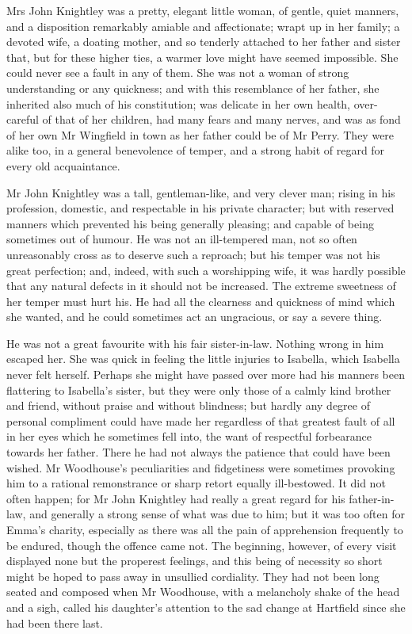 Mrs John Knightley was a pretty, elegant little woman, of gentle, quiet manners, and a disposition remarkably amiable and affectionate; wrapt up in her family; a devoted wife, a doating mother, and so tenderly attached to her father and sister that, but for these higher ties, a warmer love might have seemed impossible. She could never see a fault in any of them. She was not a woman of strong understanding or any quickness; and with this resemblance of her father, she inherited also much of his constitution; was delicate in her own health, over-careful of that of her children, had many fears and many nerves, and was as fond of her own Mr Wingfield in town as her father could be of Mr Perry. They were alike too, in a general benevolence of temper, and a strong habit of regard for every old acquaintance.

Mr John Knightley was a tall, gentleman-like, and very clever man; rising in his profession, domestic, and respectable in his private character; but with reserved manners which prevented his being generally pleasing; and capable of being sometimes out of humour. He was not an ill-tempered man, not so often unreasonably cross as to deserve such a reproach; but his temper was not his great perfection; and, indeed, with such a worshipping wife, it was hardly possible that any natural defects in it should not be increased. The extreme sweetness of her temper must hurt his. He had all the clearness and quickness of mind which she wanted, and he could sometimes act an ungracious, or say a severe thing.

He was not a great favourite with his fair sister-in-law. Nothing wrong in him escaped her. She was quick in feeling the little injuries to Isabella, which Isabella never felt herself. Perhaps she might have passed over more had his manners been flattering to Isabella's sister, but they were only those of a calmly kind brother and friend, without praise and without blindness; but hardly any degree of personal compliment could have made her regardless of that greatest fault of all in her eyes which he sometimes fell into, the want of respectful forbearance towards her father. There he had not always the patience that could have been wished. Mr Woodhouse's peculiarities and fidgetiness were sometimes provoking him to a rational remonstrance or sharp retort equally ill-bestowed. It did not often happen; for Mr John Knightley had really a great regard for his father-in-law, and generally a strong sense of what was due to him; but it was too often for Emma's charity, especially as there was all the pain of apprehension frequently to be endured, though the offence came not. The beginning, however, of every visit displayed none but the properest feelings, and this being of necessity so short might be hoped to pass away in unsullied cordiality. They had not been long seated and composed when Mr Woodhouse, with a melancholy shake of the head and a sigh, called his daughter's attention to the sad change at Hartfield since she had been there last.

